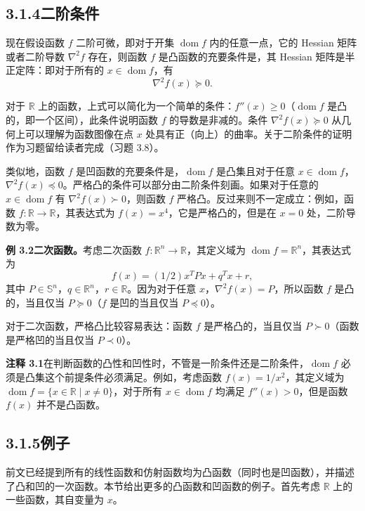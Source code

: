 \documentclass[UTF8, 12pt, fontset=fandol, oneside]{ctexart}
\DeclareMathOperator{\dom}{dom}
\begin{document}
\subsection*{3.1.4\quad 二阶条件}

现在假设函数 $f$ 二阶可微，即对于开集 $\dom f$ 内的任意一点，它的 Hessian 矩阵或者二阶导数 $\nabla^2 f$ 存在，则函数 $f$ 是凸函数的充要条件是，其 Hessian 矩阵是半正定阵：即对于所有的 $x\in\dom f$，有
\[
\nabla^2 f(x)\succeq 0.
\]

对于 $\mathbb{R}$ 上的函数，上式可以简化为一个简单的条件：$f''(x)\geq0$（$\dom f$ 是凸的，即一个区间），此条件说明函数 $f$ 的导数是非减的。条件 $\nabla^2 f(x)\succeq0$ 从几何上可以理解为函数图像在点 $x$ 处具有正（向上）的曲率。关于二阶条件的证明作为习题留给读者完成（习题 3.8）。

类似地，函数 $f$ 是凹函数的充要条件是，$\dom f$ 是凸集且对于任意 $x\in\dom f$，$\nabla^2 f(x)\preceq0$。严格凸的条件可以部分由二阶条件刻画。如果对于任意的 $x\in\dom f$ 有 $\nabla^2 f(x)\succ0$，则函数 $f$ 严格凸。反过来则不一定成立：例如，函数 $f:\mathbb{R}\to\mathbb{R}$，其表达式为 $f(x)=x^4$，它是严格凸的，但是在 $x=0$ 处，二阶导数为零。

\noindent\textbf{例 3.2\quad 二次函数。}\quad 考虑二次函数 $f:\mathbb{R}^n\to\mathbb{R}$，其定义域为 $\dom f=\mathbb{R}^n$，其表达式为
\[
f(x)=(1/2)x^TPx+q^Tx+r,
\]
其中 $P\in\mathbb{S}^n$，$q\in\mathbb{R}^n$，$r\in\mathbb{R}$。因为对于任意 $x$，$\nabla^2 f(x)=P$，所以函数 $f$ 是凸的，当且仅当 $P\succeq0$（$f$ 是凹的当且仅当 $P\preceq0$）。

对于二次函数，严格凸比较容易表达：函数 $f$ 是严格凸的，当且仅当 $P\succ0$（函数是严格凹的当且仅当 $P\prec0$）。

\noindent\textbf{注释 3.1}\quad 在判断函数的凸性和凹性时，不管是一阶条件还是二阶条件，$\dom f$ 必须是凸集这个前提条件必须满足。例如，考虑函数 $f(x)=1/x^2$，其定义域为 $\dom f=\{x\in\mathbb{R}\mid x\neq0\}$，对于所有 $x\in\dom f$ 均满足 $f''(x)>0$，但是函数 $f(x)$ 并不是凸函数。

\subsection*{3.1.5\quad 例子}

前文已经提到所有的线性函数和仿射函数均为凸函数（同时也是凹函数），并描述了凸和凹的一次函数。本节给出更多的凸函数和凹函数的例子。首先考虑 $\mathbb{R}$ 上的一些函数，其自变量为 $x$。
\end{document}
